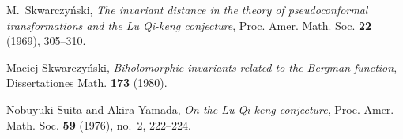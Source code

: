 \documentclass[12pt]{amsart}
\theoremstyle{definition}
\begin{document}
\begin{thebibliography}{10}
 M.~Skwarczy{\'n}ski, \emph{The invariant distance
in the theory of pseudoconformal transformations and the {L}u
{Q}i-keng conjecture}, Proc.  Amer. Math. Soc. \textbf{22}
(1969), 305--310.

 Maciej Skwarczy{\'n}ski,
\emph{Biholomorphic invariants related to the {B}ergman
function}, Dissertationes Math. \textbf{173} (1980).

 Nobuyuki Suita and Akira Yamada, \emph{On
the {L}u {Q}i-keng conjecture}, Proc.
Amer. Math. Soc. \textbf{59} (1976), no.~2, 222--224.

\end{thebibliography}
\end{document}
